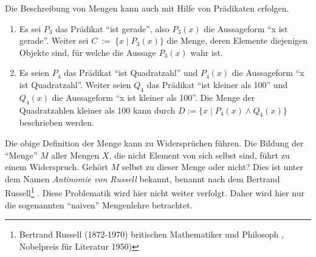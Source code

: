 \begin{Unit}[Beispiel]
Die Beschreibung von Mengen kann auch mit Hilfe von Prädikaten erfolgen.

\begin{enumerate}
\item
  Es sei $P_3$ das Prädikat \enquote{ist gerade}, also $P_3(x)$ die 
  Aussageform \enquote{x ist gerade}. Weiter sei 
  $C\ :=\ \{ x \mid P_3(x) \}$ die Menge, deren Elemente diejenigen Objekte 
  sind, für welche die Aussage $P_3(x)$ wahr   ist.
\item
  Es seien $P_4$ das Prädikat \enquote{ist Quadratzahl} und $P_4(x)$ die 
  Aussageform \enquote{x ist Quadratzahl}. Weiter seien $Q_4$ das Prädikat
  \enquote{ist kleiner als 100} und $Q_4(x)$ die Aussageform \enquote{x ist 
  kleiner als 100}. Die Menge der Quadratzahlen kleiner als 100 kann durch
  $D := \{ x \mid P_4(x) \land Q_4(x) \}$ beschrieben werden.
\end{enumerate}
\end{Unit}

\begin{Unit}[Anmerkung]
Die obige Definition der Menge kann zu Widersprüchen führen. Die Bildung der 
\enquote{Menge} $M$ aller Mengen $X$, die nicht Element von sich selbst sind, 
führt zu einem Widerspruch. Gehört $M$ selbst zu dieser Menge oder nicht? Dies
ist unter dem Namen \emph{Antinomie von Russell} bekannt, benannt nach dem
Bertrand Russell\footnote{Bertrand Russell (1872-1970) britischen 
Mathematiker und Philosoph , Nobelpreis für Literatur 1950)}
. Diese Problematik wird hier nicht weiter 
verfolgt. Daher wird hier nur die sogenannten \enquote{naiven} Mengenlehre
betrachtet.
\end{Unit}


